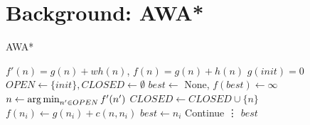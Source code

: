 \section{Background: AWA*}


\begin{algorithm}
\caption{AWA*}\label{alg:awa}
\begin{algorithmic}[1]
\Require $f'(n)=g(n)+wh(n)$, $f(n)=g(n)+h(n)$
\State $g(init) = 0$
\State $OPEN \gets \{init\}, CLOSED \gets \emptyset$
\State $best \gets $ None, $f(best) \gets \infty$ 
    \State $n \gets \operatorname*{arg\,min}_{n' \in OPEN}f'(n')$
        \State $CLOSED \gets CLOSED \cup \{n\}$ 
            \If{}
                \State $f(n_i) \gets g(n_i)+c(n,n_i)$ 
                \State $best \gets n_i$  
                \State Continue
            \EndIf
            \State \vdots
        \EndFor
    \EndIf
\EndWhile
\State \Return $best$
\end{algorithmic}
\end{algorithm}
